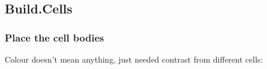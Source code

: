 \documentclass{beamer}
\begin{document}
\subsection{Build.Cells}
\begin{frame}
  \frametitle{Place the cell bodies}
  Colour doesn't mean anything, just needed contrast from different cells:

\end{frame}
\end{document}
